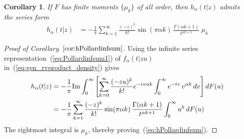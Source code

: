 \documentclass[a4paper,12pt]{article}
\newtheorem{corollary}{Corollary}[theorem]
\begin{document}
{{\begin{corollary}
\label{cor:hPollardinfsum}
 If $F$ %
 has  finite moments $\{\mu_k\}$ of all order,
then $h_\alpha(t \vert z)$ admits the series form
\begin{align}
h_\alpha(t\vert z)
 &= -\frac{1}{\pi} \sum_{k=1}^\infty \frac{(-z)^k}{k!} \sin(\pi\alpha k) \,\frac{\Gamma(\alpha k+1)}{t^{\alpha k+1}} \;  \mu_k 
\label{eq:hPollardinfsum} 
\end{align}
\end{corollary}

\begin{proof}[Proof of Corollary~$\ref{cor:hPollardinfsum}$]
Using the infinite series  representation~(\ref{eq:Pollardinfsum1}) of  $f_\alpha(t\vert z u)$ in~(\ref{eq:gen_rvproduct_density}) gives
\begin{align*}
h_\alpha(t\vert z)
  &= -\frac{1}{\pi}{\rm Im} \int_0^\infty  \left[\sum_{k=0}^\infty \frac{(-z u)^k}{k!} e^{-i\pi\alpha k} 
        \int_0^\infty e^{-tv} \, v^{\alpha k} \, dv \right]dF(u) \\
  &= -\frac{1}{\pi} \sum_{k=1}^\infty \frac{(-z)^k}{k!} \sin(\pi\alpha k) \, \frac{\Gamma(\alpha k+1)}{t^{\alpha k+1}} 
   \int_0^\infty u^k \, dF(u)
\end{align*}
The rightmost integral is $\mu_k$, thereby proving~(\ref{eq:hPollardinfsum}).
 \end{proof}

}}
\end{document}
